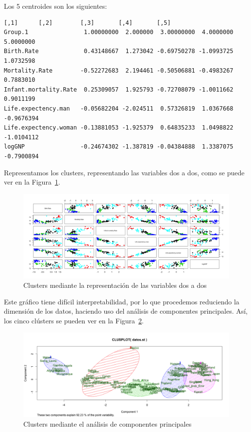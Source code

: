 \documentclass[12pt,a4paper,twoside,openright,titlepage,final]{article}
\begin{document}
Los 5 centroides son los siguientes:

\begin{Verbatim}[fontsize=\footnotesize]
                             [,1]      [,2]        [,3]       [,4]       [,5]
Group.1                1.00000000  2.000000  3.00000000  4.0000000  5.0000000
Birth.Rate             0.43148667  1.273042 -0.69750278 -1.0993725  1.0732598
Mortality.Rate        -0.52272683  2.194461 -0.50506881 -0.4983267  0.7883010
Infant.mortality.Rate  0.25309057  1.925793 -0.72708079 -1.0011662  0.9011199
Life.expectency.man   -0.05682204 -2.024511  0.57326819  1.0367668 -0.9676394
Life.expectency.woman -0.13881053 -1.925379  0.64835233  1.0498822 -1.0104112
logGNP                -0.24674302 -1.387819 -0.04384888  1.3387075 -0.7900894
\end{Verbatim}


Representamos los clusters, representando las variables dos a dos, como se puede ver en la Figura~\ref{fig:pairs_plot}.\\

\begin{figure}[tbph!]
\centering
\includegraphics[width=0.8\linewidth]{imagenes/pairs_plot}
\caption{Clusters mediante la representación de las variables dos a dos}
\label{fig:pairs_plot}
\end{figure}

Este gráfico tiene difícil interpretabilidad, por lo que procedemos reduciendo la dimensión de los datos, haciendo uso del análisis de componentes principales. Así, los cinco clústers se pueden ver en la Figura~\ref{fig:plot_5clusters}.\\

\begin{figure}[tbph!]
\centering
\includegraphics[width=0.8\linewidth]{imagenes/plot_5clusters}
\caption{Clusters mediante el análisis de componentes principales}
\label{fig:plot_5clusters}
\end{figure}
\end{document}
